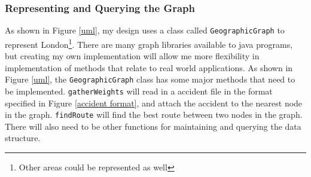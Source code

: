 \documentclass[11pt,twoside,a4paper]{article}
\begin{document}
\subsubsection{Representing and Querying the Graph}
As shown in Figure \ref{uml}, my design uses a class called \texttt{GeographicGraph} to represent London\footnote{Other areas could be represented as well}. There are many graph libraries available to java programs, but creating my own implementation
 will allow me more flexibility in implementation of methods that relate to real world applications. As shown in Figure \ref{uml}, the \texttt{GeographicGraph} class has some major methods that need to be implemented. \texttt{gatherWeights} will 
 read in a accident file in the format specified in Figure \ref{accident format}, and attach the accident to the nearest node in the graph. \texttt{findRoute} will find the best route between two nodes in the graph.
There will also need to be other functions for maintaining and querying the data structure.
\end{document}
